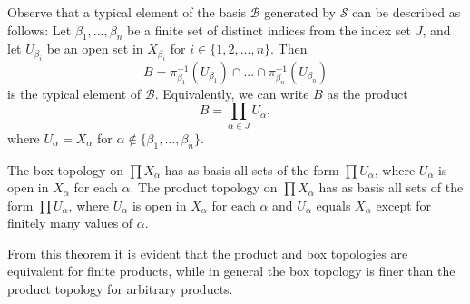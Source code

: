 \documentclass[12pt, a4paper, oneside, openright, titlepage]{book}
\begin{document}
Observe that a typical element of the basis $\mathcal{B}$ generated by $\mathcal{S}$ can be described as follows: Let $\beta_1,...,\beta_n$ be a finite set of distinct indices from the index set $J$, and let $U_{\beta_i}$ be an open set in $X_{\beta_i}$ for $i \in \{1,2,...,n\}$. Then \begin{equation*}
    B = \pi_{\beta_1}^{-1}(U_{\beta_1})\cap...\cap\pi_{\beta_n}^{-1}(U_{\beta_n})
\end{equation*}
is the typical element of $\mathcal{B}$. Equivalently, we can write $B$ as the product \begin{equation*}
    B = \prod\limits_{\alpha \in J}U_{\alpha},
\end{equation*}
where $U_{\alpha} = X_{\alpha}$ for $\alpha \notin \{\beta_1,...,\beta_n\}$.


\begin{theorem}
    The box topology on $\prod X_{\alpha}$ has as basis all sets of the form $\prod U_{\alpha}$, where $U_{\alpha}$ is open in $X_{\alpha}$ for each $\alpha$. The product topology on $\prod X_{\alpha}$ has as basis all sets of the form $\prod U_{\alpha}$, where $U_{\alpha}$ is open in $X_{\alpha}$ for each $\alpha$ and $U_{\alpha}$ equals $X_{\alpha}$ except for finitely many values of $\alpha$.
\end{theorem}

From this theorem it is evident that the product and box topologies are equivalent for finite products, while in general the box topology is finer than the product topology for arbitrary products.
\end{document}
